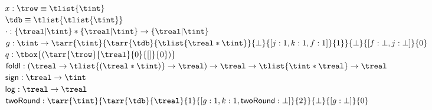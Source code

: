\begin{tabbing}
    $ x: \trow \equiv \tlist{\tint}$\\
    $ \tdb \equiv \tlist{\tlist{\tint}} $\\
    $ \cdot: \{ \treal | \tint \} * \{ \treal | \tint \} \to \{ \treal | \tint \}$\\
    $ g: \tint \to \tarr{\tint}{
    \tarr{\tdb}{\tlist{\treal * \tint}}{\bot}{[j:1, k : 1, f : 1]}{1}  
    }{\bot}{[f: \bot, j : \bot]}{0}
    $\\      
    $ q: \tbox{  (\tarr{ \trow }{ \treal }{0}{[ ]}{0})     } $\\
    $ \mathsf{foldl} : (\treal \to \tlist{(\treal * \tint)} \to \treal) \to \treal \to \tlist{\tint * \treal} \to \treal$\\
    $ \mathsf{sign} : \treal \to \tint $\\
    $ \mathsf{log} : \treal \to \treal $\\
    $ \mathsf{twoRound} : \tarr{\tint}{
    \tarr{\tdb}{\treal}{1}{[g: 1, k: 1, \mathsf{twoRound}: \bot]}{2}
    }
    {\bot}{[g:\bot]}{0} $
\end{tabbing}

